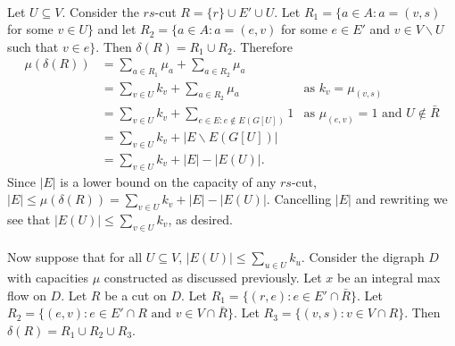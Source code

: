 \documentclass[letterpaper,12pt,oneside,onecolumn]{article}
\begin{document}
\paragraph{}
Let $U \subseteq V$. Consider the $rs$-cut $R = \{r\} \cup E' \cup U$. Let $R_1 = \{a \in A : a = (v,s) $ for some $v \in U\}$ and let $R_2 = \{a \in A : a = (e,v)$ for some $e \in E'$ and $v \in V\backslash U$ such that $v \in e \}$. Then $\delta(R) = R_1 \cup R_2 $. Therefore
\begin{align*}
\mu(\delta(R)) &= \sum_{a\in R_1} \mu_a + \sum_{a\in R_2} \mu_a \\
&= \sum_{v \in U} k_v + \sum_{a \in R_2} \mu_a  &\text{as $k_v = \mu_{(v,s)}$}\\
&= \sum_{v \in U} k_v + \sum_{e \in E : e \not\in E(G[U])} 1 &\text{as $\mu_{(e,v)} = 1$ and $U\not\in \bar{R}$}\\ 
&= \sum_{v \in U} k_v + |E \backslash E(G[U])| \\
&= \sum_{v \in U} k_v + |E| - |E(U)|.
\end{align*}
Since $|E|$ is a lower bound on the capacity of any $rs$-cut, $|E| \leq \mu(\delta(R)) = \sum_{v \in U} k_v + |E| - |E(U)|$. Cancelling $|E|$ and rewriting we see that $|E(U)| \leq \sum_{v \in U} k_v$, as desired.
\paragraph{}
Now suppose that for all $U \subseteq V$, $|E(U)| \leq \sum_{u \in U} k_u$. Consider the digraph $D$ with capacities $\mu$ constructed as discussed previously. Let $x$ be an integral max flow on $D$. Let $R$ be a cut on $D$. Let $R_1 = \{ (r,e): e \in E' \cap \bar{R}\}$. Let $R_2 = \{(e,v): e \in E' \cap R \text{ and } v \in V \cap \bar{R}\}$. Let $R_3 = \{(v,s) : v \in V \cap R\}$. Then $\delta(R) = R_1 \cup R_2 \cup R_3$.
\end{document}
